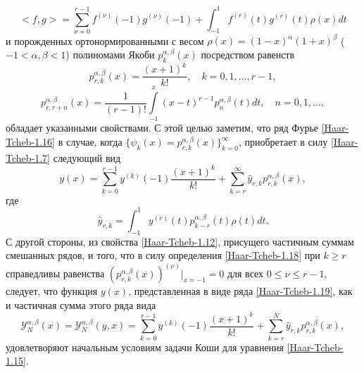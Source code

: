 \begin{equation}\label{Haar-Tcheb-1.17}
<f,g>=\sum_{\nu=0}^{r-1}f^{(\nu)}(-1)g^{(\nu)}(-1)+\int_{-1}^{1}f^{(r)}(t)g^{(r)}(t)\rho(x)dt
\end{equation}
 и порожденных ортонормированными с весом $\rho(x)=(1-x)^\alpha(1+x)^\beta$ ($-1<\alpha,\beta<1$) полиномами Якоби $p_{k}^{\alpha,\beta}(x)$  посредством равенств
   \begin{equation*}
p_{r,k}^{\alpha,\beta}(x) =\frac{(x+1)^k}{k!}, \quad k=0,1,\ldots, r-1,
\end{equation*}
  \begin{equation}\label{Haar-Tcheb-1.18}
p_{r,r+n}^{\alpha,\beta}(x) =\frac{1}{(r-1)!}\int\limits_{-1}^x(x-t)^{r-1}p_{n}^{\alpha,\beta}(t)dt, \quad n=0,1,\ldots,
\end{equation}
   обладает указанными свойствами. С этой целью заметим, что ряд Фурье \eqref{Haar-Tcheb-1.16} в случае, когда $\{\psi_k(x)=p_{r,k}^{\alpha,\beta}(x)\}_{k=0}^\infty$, приобретает в силу \eqref{Haar-Tcheb-1.7} следующий вид
   \begin{equation}\label{Haar-Tcheb-1.19}
y(x)= \sum_{k=0}^{r-1} y^{(k)}(-1)\frac{(x+1)^k}{k!}+ \sum_{k=r}^\infty \hat y_{r,k}p_{r,k}^{\alpha,\beta}(x),
\end{equation}
где
  \begin{equation*}
 \hat y_{r,k}=\int_{-1}^1 y^{(r)}(t)p_{k-r}^{\alpha,\beta}(t)\rho(t)dt.
\end{equation*}
С другой стороны, из свойства \eqref{Haar-Tcheb-1.12}, присущего частичным суммам смешанных рядов, и того, что в силу определения \eqref{Haar-Tcheb-1.18} при $k\ge r$ справедливы равенства $(p_{r,k}^{\alpha,\beta}(x))^{(\nu)}|_{x=-1}=0$ для всех $0\le\nu\le r-1$, следует, что  функция $y(x)$, представленная в виде ряда \eqref{Haar-Tcheb-1.19}, как и частичная  сумма этого ряда вида
 \begin{equation}\label{Haar-Tcheb-1.20}
\mathcal{Y}_N^{\alpha,\beta}(x)=\mathcal{Y}_N^{\alpha,\beta}(y,x)= \sum_{k=0}^{r-1} y^{(k)}(-1)\frac{(x+1)^k}{k!}+ \sum_{k=r}^N \hat y_{r,k}p_{r,k}^{\alpha,\beta}(x),
\end{equation}
удовлетворяют начальным условиям задачи Коши для уравнения \eqref{Haar-Tcheb-1.15}.

